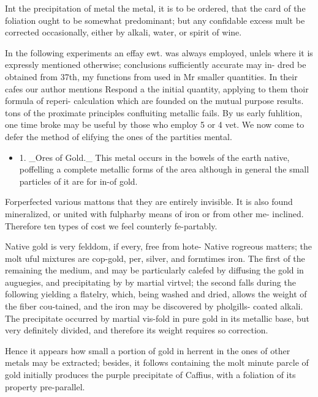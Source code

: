 \documentclass{article}
\begin{document}
Int the precipitation of metal the metal, it is to be ordered, that the card of the foliation ought to be somewhat predominant; but any confidable excess mult be corrected occasionally, either by alkali, water, or spirit of wine.

In the following experiments an effay ewt. was always employed, unlels where it is expressly mentioned otherwise; conclusions sufficiently accurate may in- dred be obtained from 37th, my functions from used in Mr smaller quantities. In their cafes our author mentions Respond a the initial quantity, applying to them thoir formula of reperi- calculation which are founded on the mutual purpose results. tons of the proximate principles confluiting metallic fails. By us early fuhlition, one time broke may be useful by those who employ 5 or 4 vet. We now come to defer the method of elifying the ones of the partities mental.

\begin{itemize}
\item 1. \_Ores of Gold.\_ This metal occurs in the bowels of the earth native, poffelling a complete metallic forms of the area although in general the small particles of it are for in-of gold.
\end{itemize}
Forperfected various mattons that they are entirely invisible. It is also found mineralized, or united with fulpharby means of iron or from other me- inclined. Therefore ten types of cost we feel counterly fe-partably.

Native gold is very felddom, if every, free from hote- Native rogreous matters; the molt uful mixtures are cop-gold, per, silver, and formtimes iron. The first of the remaining the medium, and may be particularly calefed by diffusing the gold in auguegies, and precipitating by by martial virtvel; the second falls during the following yielding a flatelry, which, being washed and dried, allows the weight of the fiber cou-tained, and the iron may be discovered by pholgills- coated alkali. The precipitate occurred by martial vis-fold in pure gold in its metallic base, but very definitely divided, and therefore its weight requires so correction.

Hence it appears how small a portion of gold in herrent in the ones of other metals may be extracted; besides, it follows containing the molt minute parcle of gold initially produces the purple precipitate of Caffius, with a foliation of its property pre-parallel.
\end{document}
